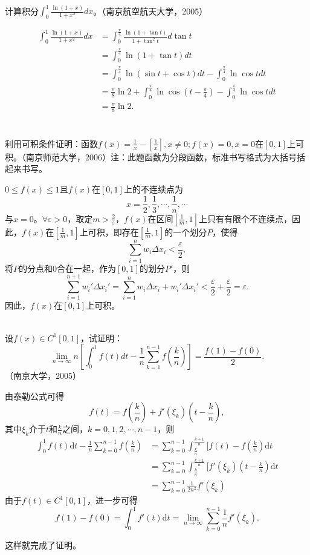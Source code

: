\begin{example}
\hfill\\
计算积分$\int_0^1\frac{\ln(1+x)}{1+x^2}dx$。（南京航空航天大学，2005）
  
  \begin{align*}
  \int_0^1\frac{\ln(1+x)}{1+x^2}dx&=\int_0^{\frac{\pi}{4}}\frac{\ln(1+\tan t)}{1+\tan^2t}d\tan t\\
  &=\int_0^{\frac{\pi}{4}}\ln(1+\tan t)dt\\
  &=\int_0^{\frac{\pi}{4}}\ln(\sin t+\cos t)dt-\int_0^{\frac{\pi}{4}}\ln\cos tdt\\
  &=\frac{\pi}{8}\ln2+\int_0^{\frac{\pi}{4}}\ln\cos(t-\frac{\pi}{4})-\int_0^{\frac{\pi}{4}}\ln\cos tdt\\
  &=\frac{\pi}{8}\ln2.\\
  \end{align*}
\end{example}
\begin{example}
  \hfill\\
   利用可积条件证明：函数$f(x)=\frac1x-[\frac1x],x\neq0;f(x)=0,x=0$在$[0,1]$上可积。（南京师范大学，2006）注：此题函数为分段函数，标准书写格式为大括号括起来书写。
   
     $0\leq f(x)\leq1$且$f(x)$在$[0,1]$上的不连续点为$$x=\frac{1}{2},\frac{1}{3},\cdots,\frac{1}{n},\cdots$$与$x=0$。$\forall\varepsilon>0$，取定$m>\frac{2}{\varepsilon}$，$f(x)$在区间$[\frac{1}{m},1]$上只有有限个不连续点，因此，$f(x)$在$[\frac{1}{m},1]$上可积，即存在$[\frac{1}{m},1]$的一个划分$P$，使得
  $$\sum_{i=1}^nw_i\Delta x_i<\frac{\varepsilon}{2},$$
  将$P$的分点和$0$合在一起，作为$[0,1]$的划分$P'$，则
  $$\sum_{i=1}^{n+1}w_i'\Delta x_i'=\sum_{i=1}^nw_i\Delta x_i+w_i'\Delta x_i'<\frac{\varepsilon}{2}+\frac{\varepsilon}{2}=\varepsilon.$$
  因此，$f(x)$在$[0,1]$上可积。
\end{example}
\begin{example}
\hfill\\
 设$f(x)\in C^1[0,1]$，试证明：$$\displaystyle\lim_{n\rightarrow\infty}n[\int_0^1f(t)dt-\frac1n\sum_{k=1}^{n-1}f(\frac kn)]=\frac{f(1)-f(0)}2.$$（南京大学，2005）
 
 由泰勒公式可得
$$f(t)=f(\frac{k}{n})+f'(\xi_k)(t-\frac{k}{n}),$$
其中$\xi_k$介于$t$和$\frac{k}{n}$之间，$k=0,1,2,\cdots,n-1$，则
\begin{align*}
\int_0^1f(t)\mathrm{d}t-\frac{1}{n}\sum_{k=0}^{n-1}f(\frac{k}{n})
&=\sum_{k=0}^{n-1}\int_{\frac{k}{n}}^{\frac{k+1}{n}}[f(t)-f(\frac{k}{n})\mathrm{d}t\\
&=\sum_{k=0}^{n-1}\int_{\frac{k}{n}}^{\frac{k+1}{n}}[f'(\xi_k)(t-\frac{k}{n})\mathrm{d}t\\
&=\sum_{k=0}^{n-1}\frac{1}{2n^2}f'(\xi_k)
\end{align*}
由于$f(t)\in C^1[0,1]$，进一步可得
$$f(1)-f(0)=\int_0^1f'(t)\mathrm{d}t=\lim_{n\rightarrow\infty}\sum_{k=0}^{n-1}\frac{1}{n}f'(\xi_k).$$

这样就完成了证明。
\end{example}
